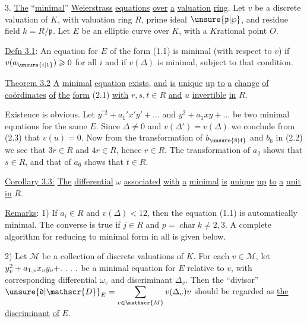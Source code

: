 3. \uline{The} ``\uline{minimal}'' \uline{Weierstrass} \uline{equations} \uline{over} \uline{a} \uline{valuation} \uline{ring}. Let $v$ be a discrete valuation of $K$, with valuation ring $R$, prime ideal $\unsure{\mathfrak{p}|\wp}$, and residue field $k=R/\mathfrak{p}$. Let $E$ be an elliptic curve over $K$, with a $K$rational point $O$.

\uline{Defn 3.1}: An equation for $E$ of the form (1.1) is minimal (with respect to $v$) if $v(a_{\unsure{i|1}})\geqslant0$ for all $i$ and if $v(\Delta)$ is minimal, subject to that condition.

\uline{Theorem 3.2} \uline{A} \uline{minimal} \uline{equation}  \uline{exists}, \uline{and} \uline{is} \uline{unique} \uline{up} \uline{to} \uline{a} \uline{change} \uline{of} \uline{coördinates} \uline{of} \uline{the} \uline{form} (2.1) \uline{with} $r,s,t\in R$ \uline{and} $u$ \uline{invertible} \uline{in} $R$.

Existence is obvious. Let $y^{\prime\,2}+a_1'x'y'+\ldots$ and $y^2+a_1xy+\ldots$ be two minimal equations for the same $E$. Since $\Delta\ne0$ and $v(\Delta')=v(\Delta)$ we conclude from (2.3) that $v(u)=0$. Now from the transformation of $b_{\unsure{8|4}}$ and $b_6$ in (2.2) we see that $3r\in R$ and $4r\in R$, hence $r\in R$.  The transformation of $a_2$ shows that $s\in R$, and that of $a_6$ shows that $t\in R$.

\uline{Corollary 3.3:} \uline{The} \uline{differential} $\omega$ \uline{associated} \uline{with} \uline{a} \uline{minimal}  \uline{is} \uline{unique} \uline{up} \uline{to} \uline{a} \uline{unit} \uline{in} $R$.

\uline{Remarks}: 1) If $a_i\in R$ and $v(\Delta)<12$, then the equation (1.1) is automatically minimal. The converse is true if $j\in R$ and $p=\operatorname{char}k\ne2,3$. A complete algorithm for reducing to minimal form in all  is given below.

2) Let $\mathscr{M}$ be a collection of discrete valuations of $K$. For each $v\in\mathscr{M}$, let $y_v^2+a_{1,v}x_vy_v+\ldotp\,\ldotp\,\ldotp\,\ldotp$ be a minimal equation for $E$ relative to $v$, with corresponding differential $\omega_v$ and discriminant $\Delta_v$. Then the ``divisor'' $\displaystyle \unsure{\mathfrak{d}|\mathscr{D}}_E=\sum_{v\in\mathscr{M}}v(\Delta_v)v$ should be regarded as \uline{the} \uline{discriminant} \uline{of} $E$.

